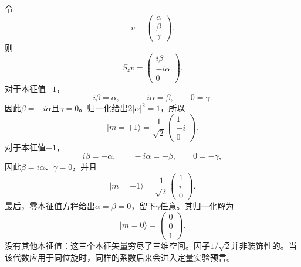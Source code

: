 令
\begin{equation}
v=
\begin{pmatrix}
\alpha\\
\beta\\
\gamma
\end{pmatrix}.
\end{equation}
则
\begin{equation}
S_zv
=
\begin{pmatrix}
i\beta\\
-i\alpha\\
0
\end{pmatrix}.
\end{equation}
对于本征值\(+1\)，
\begin{equation}
i\beta=\alpha,
\qquad
-i\alpha=\beta,
\qquad
0=\gamma.
\end{equation}
因此\(\beta=-i\alpha\)且\(\gamma=0\)。归一化给出\(2|\alpha|^2=1\)，所以
\begin{equation}
|m=+1\rangle
=
\frac{1}{\sqrt2}
\begin{pmatrix}
1\\
-i\\
0
\end{pmatrix}.
\end{equation}
对于本征值\(-1\)，
\begin{equation}
i\beta=-\alpha,
\qquad
-i\alpha=-\beta,
\qquad
0=-\gamma,
\end{equation}
因此\(\beta=i\alpha\)、\(\gamma=0\)，并且
\begin{equation}
|m=-1\rangle
=
\frac{1}{\sqrt2}
\begin{pmatrix}
1\\
i\\
0
\end{pmatrix}.
\end{equation}
最后，零本征值方程给出\(\alpha=\beta=0\)，留下\(\gamma\)任意。其归一化解为
\begin{equation}
|m=0\rangle
=
\begin{pmatrix}
0\\
0\\
1
\end{pmatrix}.
\end{equation}
没有其他本征值：这三个本征矢量穷尽了三维空间。因子\(1/\sqrt2\)并非装饰性的。当该代数应用于同位旋时，同样的系数后来会进入定量实验预言。

\begin{classroomqa}
\end{classroomqa}

